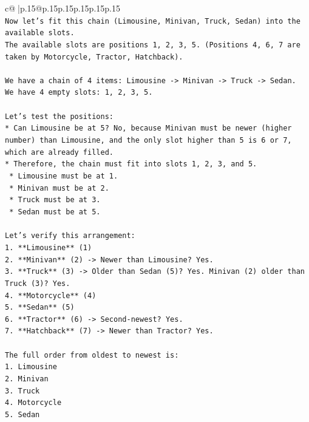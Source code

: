 \documentclass{article}
\begin{document}
{\begin{supertabular}{c@{$\;$}|p{.15\linewidth}@{}p{.15\linewidth}p{.15\linewidth}p{.15\linewidth}p{.15\linewidth}p{.15\linewidth}}
{{{\\ 
\texttt{Now let's fit this chain (Limousine, Minivan, Truck, Sedan) into the available slots.} \\
\texttt{The available slots are positions 1, 2, 3, 5. (Positions 4, 6, 7 are taken by Motorcycle, Tractor, Hatchback).} \\
\\ 
\texttt{We have a chain of 4 items: Limousine {-}> Minivan {-}> Truck {-}> Sedan.} \\
\texttt{We have 4 empty slots: 1, 2, 3, 5.} \\
\\ 
\texttt{Let's test the positions:} \\
\texttt{*   Can Limousine be at 5? No, because Minivan must be newer (higher number) than Limousine, and the only slot higher than 5 is 6 or 7, which are already filled.} \\
\texttt{*   Therefore, the chain must fit into slots 1, 2, 3, and 5.} \\
\texttt{    *   Limousine must be at 1.} \\
\texttt{    *   Minivan must be at 2.} \\
\texttt{    *   Truck must be at 3.} \\
\texttt{    *   Sedan must be at 5.} \\
\\ 
\texttt{Let's verify this arrangement:} \\
\texttt{1.  **Limousine** (1)} \\
\texttt{2.  **Minivan** (2) {-}> Newer than Limousine? Yes.} \\
\texttt{3.  **Truck** (3) {-}> Older than Sedan (5)? Yes. Minivan (2) older than Truck (3)? Yes.} \\
\texttt{4.  **Motorcycle** (4)} \\
\texttt{5.  **Sedan** (5)} \\
\texttt{6.  **Tractor** (6) {-}> Second{-}newest? Yes.} \\
\texttt{7.  **Hatchback** (7) {-}> Newer than Tractor? Yes.} \\
\\ 
\texttt{The full order from oldest to newest is:} \\
\texttt{1. Limousine} \\
\texttt{2. Minivan} \\
\texttt{3. Truck} \\
\texttt{4. Motorcycle} \\
\texttt{5. Sedan} \\
}}}
\end{supertabular}}
\end{document}
